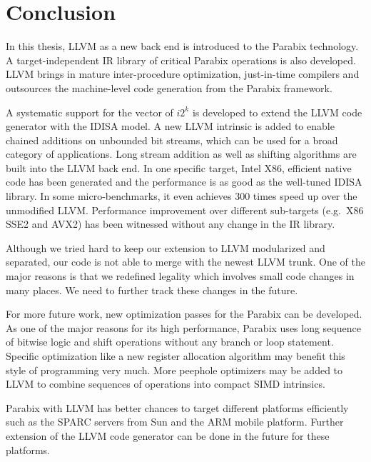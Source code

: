 %
%
\chapter{Conclusion}
\label{seven}

In this thesis, LLVM as a new back end is introduced to the Parabix technology. A target-independent IR library of critical Parabix operations is also developed. LLVM brings in mature inter-procedure optimization, just-in-time compilers and outsources the machine-level code generation from the Parabix framework.

A systematic support for the vector of $i2^k$ is developed to extend the LLVM code generator with the IDISA model. A new LLVM intrinsic is added to enable chained additions on unbounded bit streams, which can be used for a broad category of applications. Long stream addition as well as shifting algorithms are built into the LLVM back end. In one specific target, Intel X86, efficient native code has been generated and the performance is as good as the well-tuned IDISA library. In some micro-benchmarks, it even achieves 300 times speed up over the unmodified LLVM\@. Performance improvement over different sub-targets (e.g.\ X86 SSE2 and AVX2) has been witnessed without any change in the IR library.

Although we tried hard to keep our extension to LLVM modularized and separated, our code is not able to merge with the newest LLVM trunk. One of the major reasons is that we redefined legality which involves small code changes in many places. We need to further track these changes in the future.

For more future work, new optimization passes for the Parabix can be developed. As one of the major reasons for its high performance, Parabix uses long sequence of bitwise logic and shift operations without any branch or loop statement. Specific optimization like a new register allocation algorithm may benefit this style of programming very much. More peephole optimizers may be added to LLVM to combine sequences of operations into compact SIMD intrinsics.

Parabix with LLVM has better chances to target different platforms efficiently such as the SPARC servers from Sun and the ARM mobile platform. Further extension of the LLVM code generator can be done in the future for these platforms.

